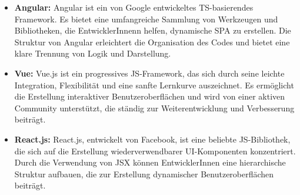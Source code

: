 \begin{itemize}

    \item \textbf{Angular:} Angular ist ein von Google entwickeltes \acl{TS}-basierendes Framework. Es bietet eine umfangreiche Sammlung von Werkzeugen und Bibliotheken, die EntwicklerInnenn helfen, dynamische \acf{SPA} zu erstellen. Die Struktur von Angular erleichtert die Organisation des Codes und bietet eine klare Trennung von Logik und Darstellung.\cite{angular}

    \item \textbf{Vue:} Vue.js ist ein progressives \acl{JS}-Framework, das sich durch seine leichte Integration, Flexibilität und eine sanfte Lernkurve auszeichnet. Es ermöglicht die Erstellung interaktiver Benutzeroberflächen und wird von einer aktiven Community unterstützt, die ständig zur Weiterentwicklung und Verbesserung beiträgt.\cite{vuejs}

    \item \textbf{React.js:} React.js, entwickelt von Facebook, ist eine beliebte \acl{JS}-Bibliothek, die sich auf die Erstellung wiederverwendbarer \acf{UI}-Komponenten konzentriert. Durch die Verwendung von \acf{JSX} können EntwicklerInnen eine hierarchische Struktur aufbauen, die zur Erstellung dynamischer Benutzeroberflächen beiträgt.\cite{reactjs}
\end{itemize}

